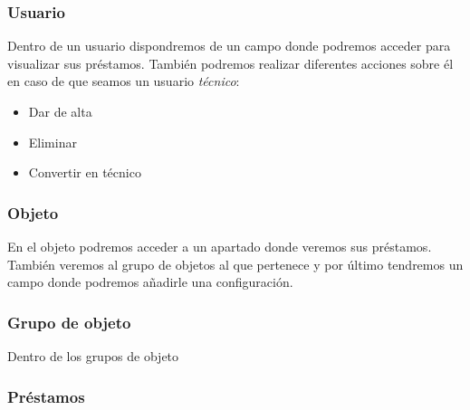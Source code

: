 \subsubsection{Usuario}
Dentro de un usuario dispondremos de un campo donde podremos acceder para visualizar sus préstamos. También podremos realizar diferentes acciones sobre él en caso de que seamos un usuario \textit{técnico}:
\begin{itemize}
    \item Dar de alta
    \item Eliminar
    \item Convertir en técnico
\end{itemize}

\subsubsection{Objeto}
En el objeto podremos acceder a un apartado donde veremos sus préstamos. También veremos al grupo de objetos al que pertenece y por último tendremos un campo donde podremos añadirle una configuración.

\subsubsection{Grupo de objeto}
Dentro de los grupos de objeto

\subsubsection{Préstamos}
